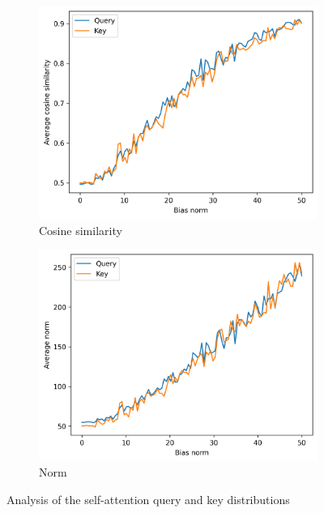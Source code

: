 \begin{figure}[ht]
    \centering
    \begin{subfigure}[b]{0.48\columnwidth}
         \includegraphics[width=\linewidth]{sources/part_1/anisotropy/imgs/trained_bert_base_bias_vs_kq_cos.png}
         \caption{Cosine similarity}
         \label{fig:cos_qk_trained_transformer}
    \end{subfigure}
    \hfill
    \begin{subfigure}[b]{0.48\columnwidth}
         \includegraphics[width=\linewidth]{sources/part_1/anisotropy/imgs/trained_bert_base_bias_vs_kq_norm.png}
         \caption{Norm}
         \label{fig:norm_qk_trained_transformer}
    \end{subfigure}
    \caption{Analysis of the self-attention query and key distributions}
    \label{fig:kq}
\end{figure}

